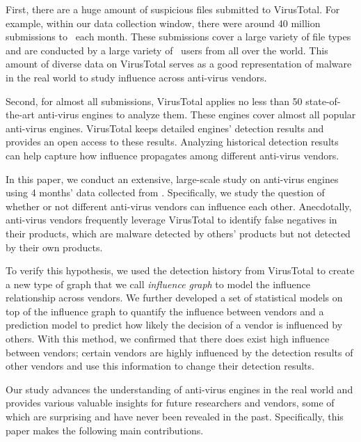 First, there are a huge amount of suspicious files submitted to VirusTotal. 
For example, within our data collection window, 
there were around 40 million submissions to \vt\ each month. 
These submissions cover a large variety of file types and 
are conducted by a large variety of \vt\ users from all over the world. 
This amount of diverse data on VirusTotal serves as a 
good representation of malware in the real world to study influence across anti-virus vendors. 

Second, for almost all submissions, 
VirusTotal applies no less than 50 state-of-the-art anti-virus engines to analyze them. 
These engines cover almost all popular anti-virus engines.
VirusTotal keeps detailed engines' detection results and provides an open access to these results. 
Analyzing historical detection results can help capture how influence propagates among different anti-virus vendors. 

In this paper, we conduct an extensive, 
large-scale study on anti-virus engines
using 4 months' data collected from \vt.
Specifically, we study the question of whether or not different anti-virus vendors can influence each other.
Anecdotally, anti-virus vendors frequently leverage VirusTotal to identify false negatives in their products, 
which are malware detected by others' products but not detected by their own products. 

To verify this hypothesis, we used the detection history from VirusTotal to create a new type of graph that we call 
{\em influence graph} to model the influence relationship across vendors.
We further developed a set of statistical models on top of the influence graph to quantify the influence between vendors
and a prediction model to predict how likely the decision of a vendor is influenced by others. 
With this method, we confirmed that there does exist high influence between vendors;
certain vendors are highly influenced by the detection results of other vendors 
and use this information to change their detection results.

Our study advances the understanding of anti-virus engines in the real world 
and provides various valuable insights for future researchers and vendors, 
some of which are surprising and have never been revealed in the past.
Specifically, this paper makes the following main contributions.


